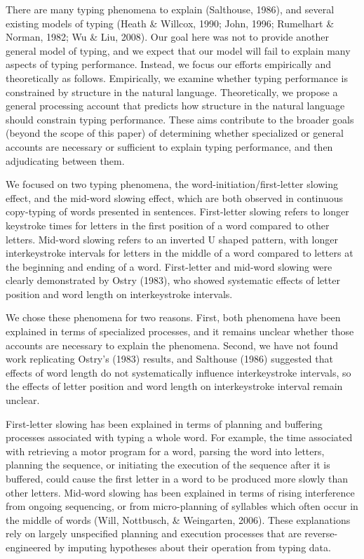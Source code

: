 \documentclass[floatsintext,man]{apa6}
\theoremstyle{definition}
\theoremstyle{definition}
\theoremstyle{definition}
\theoremstyle{remark}
\begin{document}
There are many typing phenomena to explain (Salthouse, 1986), and
several existing models of typing (Heath \& Willcox, 1990; John, 1996;
Rumelhart \& Norman, 1982; Wu \& Liu, 2008). Our goal here was not to
provide another general model of typing, and we expect that our model
will fail to explain many aspects of typing performance. Instead, we
focus our efforts empirically and theoretically as follows. Empirically,
we examine whether typing performance is constrained by structure in the
natural language. Theoretically, we propose a general processing account
that predicts how structure in the natural language should constrain
typing performance. These aims contribute to the broader goals (beyond
the scope of this paper) of determining whether specialized or general
accounts are necessary or sufficient to explain typing performance, and
then adjudicating between them.

We focused on two typing phenomena, the word-initiation/first-letter
slowing effect, and the mid-word slowing effect, which are both observed
in continuous copy-typing of words presented in sentences. First-letter
slowing refers to longer keystroke times for letters in the first
position of a word compared to other letters. Mid-word slowing refers to
an inverted U shaped pattern, with longer interkeystroke intervals for
letters in the middle of a word compared to letters at the beginning and
ending of a word. First-letter and mid-word slowing were clearly
demonstrated by Ostry (1983), who showed systematic effects of letter
position and word length on interkeystroke intervals.

We chose these phenomena for two reasons. First, both phenomena have
been explained in terms of specialized processes, and it remains unclear
whether those accounts are necessary to explain the phenomena. Second,
we have not found work replicating Ostry's (1983) results, and Salthouse
(1986) suggested that effects of word length do not systematically
influence interkeystroke intervals, so the effects of letter position
and word length on interkeystroke interval remain unclear.

First-letter slowing has been explained in terms of planning and
buffering processes associated with typing a whole word. For example,
the time associated with retrieving a motor program for a word, parsing
the word into letters, planning the sequence, or initiating the
execution of the sequence after it is buffered, could cause the first
letter in a word to be produced more slowly than other letters. Mid-word
slowing has been explained in terms of rising interference from ongoing
sequencing, or from micro-planning of syllables which often occur in the
middle of words (Will, Nottbusch, \& Weingarten, 2006). These
explanations rely on largely unspecified planning and execution
processes that are reverse-engineered by imputing hypotheses about their
operation from typing data.
\end{document}
